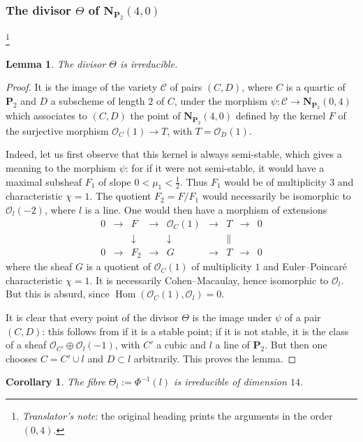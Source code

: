 \documentclass[12pt,english]{smfart}%
\theoremstyle{plain}
\newtheorem{lemma}[theorem]{Lemma}
\newtheorem{corollary}[theorem]{Corollary}
\theoremstyle{definition}
\theoremstyle{remark}
\newcommand{\PP}{\mathbf{P}}
\newcommand{\NN}{\mathbf{N}}           %
\newcommand{\Oo}{\mathcal{O}}
\DeclareMathOperator{\Hom}{Hom}
\newcommand{\origpage}[1]{\marginnote{\scriptsize\itshape p.~#1}}
\newcommand{\tnote}[1]{\footnote{\emph{Translator's note}: #1}}
\begin{document}
\origpage{665}%
\subsubsection*{The divisor $\Theta$ of $\NN_{\PP_2}(4,0)$}\tnote{the original heading prints the arguments in the order $(0,4)$.}

\begin{lemma}\label{lem:Theta-irred}
The divisor $\Theta$ is irreducible.
\end{lemma}

\begin{proof}
It is the image of the variety $\mathscr{C}$ of pairs $(C,D)$, where $C$ is a quartic of $\PP_2$ and $D$ a subscheme of length $2$ of $C$, under the morphism $\psi:\mathscr{C}\to \NN_{\PP_2}(0,4)$ which associates to $(C,D)$ the point of $\NN_{\PP_2}(4,0)$ defined by the kernel $F$ of the surjective morphism $\Oo_C(1)\to T$, with $T=\Oo_D(1)$.

Indeed, let us first observe that this kernel is always semi-stable, which gives a meaning to the morphism $\psi$: for if it were not semi-stable, it would have a maximal subsheaf $F_1$ of slope $0<\mu_1<\tfrac12$. Thus $F_1$ would be of multiplicity $3$ and characteristic $\chi=1$. The quotient $F_2=F/F_1$ would necessarily be isomorphic to $\Oo_l(-2)$, where $l$ is a line. One would then have a morphism of extensions
\[
\begin{array}{ccccccccc}
0 &\to& F &\to& \Oo_C(1) &\to& T &\to& 0\\
&& \downarrow && \downarrow && \| &&\\
0 &\to& F_2 &\to& G &\to& T &\to& 0
\end{array}
\]
where the sheaf $G$ is a quotient of $\Oo_C(1)$ of multiplicity $1$ and Euler--Poincar\'e characteristic $\chi=1$. It is necessarily Cohen--Macaulay, hence isomorphic to $\Oo_l$. But this is absurd, since $\Hom(\Oo_C(1),\Oo_l)=0$.

It is clear that every point of the divisor $\Theta$ is the image under $\psi$ of a pair $(C,D)$: this follows from  if it is a stable point; if it is not stable, it is the class of a sheaf $\Oo_{C'}\oplus \Oo_l(-1)$, with $C'$ a cubic and $l$ a line of $\PP_2$. But then one chooses $C=C'\cup l$ and $D\subset l$ arbitrarily. This proves the lemma.
\end{proof}

\begin{corollary}\label{cor:Theta-l}
The fibre $\Theta_l := \Phi^{-1}(l)$ is irreducible of dimension $14$.
\end{corollary}
\end{document}
